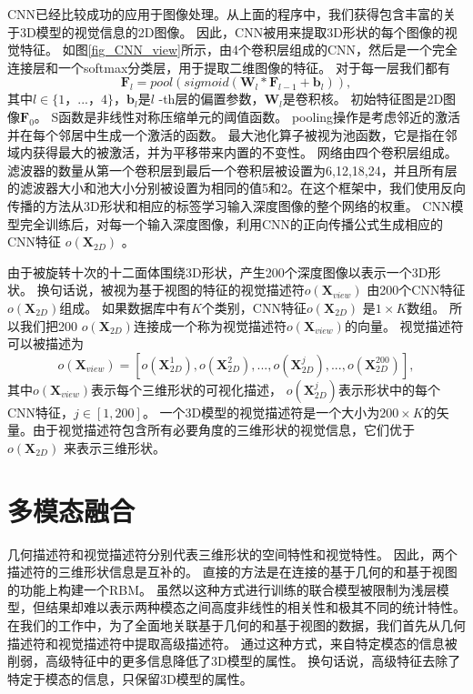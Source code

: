 CNN已经比较成功的应用于图像处理。从上面的程序中，我们获得包含丰富的关于3D模型的视觉信息的2D图像。 因此，CNN被用来提取3D形状的每个图像的视觉特征。 如图\ref{fig_CNN_view}所示，由4个卷积层组成的CNN，然后是一个完全连接层和一个softmax分类层，用于提取二维图像的特征。 对于每一层我们都有
%
\begin{equation}
	\mathbf{F}_l = pool(sigmoid(\mathbf{W}_l * \mathbf{F}_{l-1} + \mathbf{b}_l)),
\label{cal_CNN}
\end{equation}
%
其中$ l \in \{1，...，4 \} $，$ \mathbf {b} _l $是$ l $ -th层的偏置参数，$ \mathbf {W} _l $是卷积核。 初始特征图是2D图像$ \mathbf{F}_0 $。 S函数是非线性对称压缩单元的阈值函数。 pooling操作是考虑邻近的激活并在每个邻居中生成一个激活的函数。 最大池化算子被视为池函数，它是指在邻域内获得最大的被激活，并为平移带来内置的不变性。
网络由四个卷积层组成。滤波器的数量从第一个卷积层到最后一个卷积层被设置为6,12,18,24，并且所有层的滤波器大小和池大小分别被设置为相同的值5和2。在这个框架中，我们使用反向传播的方法\cite{Cun1990Handwritten}从3D形状和相应的标签学习输入深度图像的整个网络的权重。 CNN模型完全训练后，对每一个输入深度图像，利用CNN的正向传播公式生成相应的CNN特征 $o(\mathbf{X}_{2D})$ 。

由于被旋转十次的十二面体围绕3D形状，产生200个深度图像以表示一个3D形状。 换句话说，被视为基于视图的特征的视觉描述符$o(\mathbf{X}_{view})$ 由200个CNN特征$o(\mathbf{X}_{2D})$组成。 如果数据库中有$K$个类别，CNN特征$o(\mathbf{X}_{2D})$ 是$1 \times K$数组。 所以我们把200 $o(\mathbf{X}_{2D})$连接成一个称为视觉描述符$o(\mathbf{X}_{view})$的向量。 视觉描述符可以被描述为
%
\begin{equation}
	o(\mathbf{X}_{view}) = [o(\mathbf{X}^1_{2D}),o(\mathbf{X}^2_{2D}),...,o(\mathbf{X}^j_{2D}),...,o(\mathbf{X}^{200}_{2D})],
\label{cal_visual_descriptor}
\end{equation}
%
其中$o(\mathbf{X}_{view})$表示每个三维形状的可视化描述， $o(\mathbf{X}^j_{2D})$表示形状中的每个CNN特征，$j \in [1,200]$。 一个3D模型的视觉描述符是一个大小为$200 \times K$的矢量。由于视觉描述符包含所有必要角度的三维形状的视觉信息，它们优于 $o(\mathbf{X}_{2D})$ 来表示三维形状。


\section{多模态融合}

几何描述符和视觉描述符分别代表三维形状的空间特性和视觉特性。 因此，两个描述符的三维形状信息是互补的。 直接的方法是在连接的基于几何的和基于视图的功能上构建一个RBM。 虽然以这种方式进行训练的联合模型被限制为浅层模型，但结果却难以表示两种模态之间高度非线性的相关性和极其不同的统计特性。 在我们的工作中，为了全面地关联基于几何的和基于视图的数据，我们首先从几何描述符和视觉描述符中提取高级描述符。 通过这种方式，来自特定模态的信息被削弱，高级特征中的更多信息降低了3D模型的属性。 换句话说，高级特征去除了特定于模态的信息，只保留3D模型的属性。

